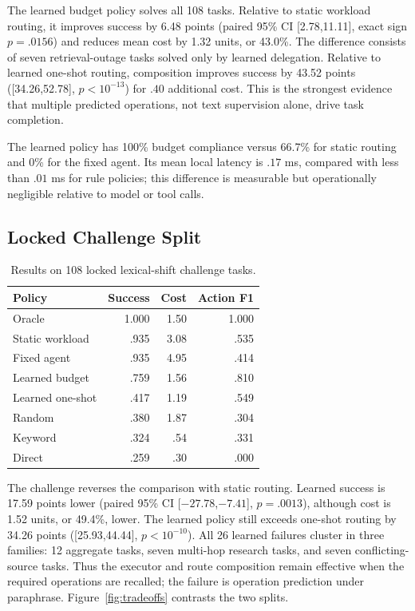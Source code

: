 \documentclass[letterpaper]{article} %
\begin{document}
The learned budget policy solves all 108 tasks. Relative to static workload routing, it improves success by 6.48 points (paired 95\% CI [2.78,11.11], exact sign $p=.0156$) and reduces mean cost by 1.32 units, or 43.0\%. The difference consists of seven retrieval-outage tasks solved only by learned delegation. Relative to learned one-shot routing, composition improves success by 43.52 points ([34.26,52.78], $p<10^{-13}$) for $.40$ additional cost. This is the strongest evidence that multiple predicted operations, not text supervision alone, drive task completion.

The learned policy has 100\% budget compliance versus 66.7\% for static routing and 0\% for the fixed agent. Its mean local latency is $.17$ ms, compared with less than $.01$ ms for rule policies; this difference is measurable but operationally negligible relative to model or tool calls.

\subsection{Locked Challenge Split}

\begin{table}[t]
\centering
\small
\caption{Results on 108 locked lexical-shift challenge tasks.}
\label{tab:challenge}
\begin{tabular}{lrrr}
\toprule
Policy & Success & Cost & Action F1 \\
\midrule
Oracle & 1.000 & 1.50 & 1.000 \\
Static workload & .935 & 3.08 & .535 \\
Fixed agent & .935 & 4.95 & .414 \\
Learned budget & .759 & 1.56 & .810 \\
Learned one-shot & .417 & 1.19 & .549 \\
Random & .380 & 1.87 & .304 \\
Keyword & .324 & .54 & .331 \\
Direct & .259 & .30 & .000 \\
\bottomrule
\end{tabular}
\end{table}

The challenge reverses the comparison with static routing. Learned success is 17.59 points lower (paired 95\% CI [$-27.78$,$-7.41$], $p=.0013$), although cost is 1.52 units, or 49.4\%, lower. The learned policy still exceeds one-shot routing by 34.26 points ([25.93,44.44], $p<10^{-10}$). All 26 learned failures cluster in three families: 12 aggregate tasks, seven multi-hop research tasks, and seven conflicting-source tasks. Thus the executor and route composition remain effective when the required operations are recalled; the failure is operation prediction under paraphrase. Figure~\ref{fig:tradeoffs} contrasts the two splits.
\end{document}

